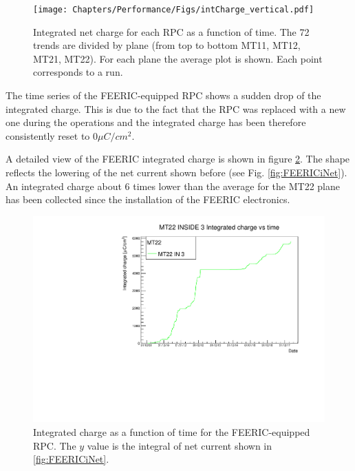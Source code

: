 \begin{figure}[!t]
\begin{center}
\texttt{[image: Chapters/Performance/Figs/intCharge\_vertical.pdf]}
\caption{Integrated net charge for each RPC as a function of time. The 72 trends are divided by plane (from top to bottom MT11, MT12, MT21, MT22). For each plane the average plot is shown. Each point corresponds to a run.}
\label{fig:ICharge4Planes}
\end{center}
\end{figure}


The time series of the FEERIC-equipped RPC shows a sudden drop of the integrated charge. 
This is due to the fact that the RPC was replaced with a new one during the operations and the integrated charge has been therefore consistently reset to $0\mu C/cm^2$.

A detailed view of the FEERIC integrated charge is shown in figure \ref{fig:FEERICIntCharge}.
The shape reflects the lowering of the net current shown before (see Fig. \ref{fig:FEERICiNet}).
An integrated charge about $6$ times lower than the average for the MT22 plane has been collected since the installation of the FEERIC electronics.

\begin{figure}[!t]
\begin{center}
\includegraphics[width=0.95\linewidth]{Chapters/Performance/Figs/IntChargeFEERIC.pdf}
\caption{Integrated charge as a function of time for the FEERIC-equipped RPC. The $y$ value is the integral of net current shown in \ref{fig:FEERICiNet}.}
\label{fig:FEERICIntCharge}
\end{center}
\end{figure}

